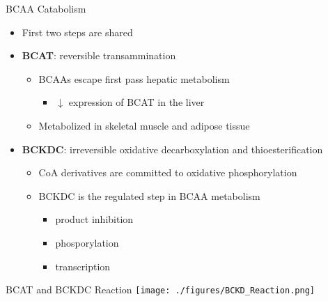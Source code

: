 \documentclass[presentation, smaller]{beamer}
\begin{document}
\begin{frame}[label={sec:orgheadline7}]{BCAA Catabolism}
\begin{itemize}
\item First two steps are shared
\item \textbf{BCAT}: reversible transammination
\begin{itemize}
\item BCAAs escape first pass hepatic metabolism
\begin{itemize}
\item \(\downarrow\) expression of BCAT in the liver
\end{itemize}
\item Metabolized in skeletal muscle and adipose tissue
\end{itemize}
\item \textbf{BCKDC}: irreversible oxidative decarboxylation and thioesterification
\begin{itemize}
\item CoA derivatives are committed to oxidative phosphorylation
\item BCKDC is the regulated step in BCAA metabolism
\begin{itemize}
\item product inhibition
\item phosporylation
\item transcription
\end{itemize}
\end{itemize}
\end{itemize}
\end{frame}

\begin{frame}[label={sec:orgheadline8}]{BCAT and BCKDC Reaction}
\centering
\texttt{[image: ./figures/BCKD\_Reaction.png]}
\end{frame}
\end{document}
